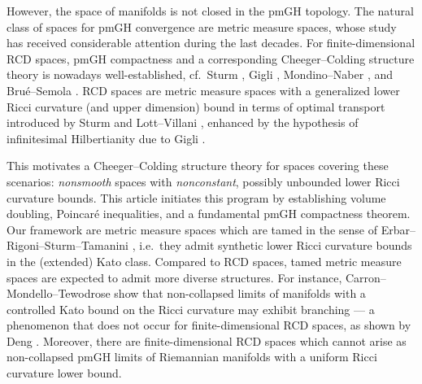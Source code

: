 \documentclass[10pt]{article}
\theoremstyle{plain}
\theoremstyle{definition}
\begin{document}
However, the space of manifolds is not closed in the pmGH topology. The natural class of spaces for pmGH convergence are metric measure spaces, whose study has received considerable attention during the last decades. For finite-dimensional RCD spaces, pmGH compactness and a corresponding Cheeger--Colding structure theory is nowadays well-established, cf.~Sturm \cite{sturm2006-ii}, Gigli \cite{gigli-splitting}, Mondino--Naber \cite{MondinoNaber}, and Brué--Semola \cite{BrueSemola}. RCD spaces are metric measure spaces with a generalized lower Ricci curvature (and upper dimension) bound in terms of optimal transport introduced by Sturm \cite{sturm2006-i,sturm2006-ii} and Lott--Villani \cite{lott-villani2009}, enhanced by the hypothesis of infinitesimal Hilbertianity due to Gigli \cite{Gigli15}. 

This motivates a Cheeger--Colding structure theory for spaces covering these scenarios: \emph{non\-smooth} spaces with \emph{nonconstant}, possibly unbounded lower Ricci curvature bounds. This article initiates this program by establishing volume doubling, Poincaré inequalities, and a fundamental pmGH compactness theorem. Our framework are metric measure spaces which are tamed in the sense of Erbar--Rigoni--Sturm--Tamanini \cite{ERST}, i.e.~they admit synthetic lower Ricci curvature bounds in the (extended) Kato class. Compared to RCD spaces, tamed metric measure spaces are expected to admit more diverse structures. For instance, Carron--Mondello--Tewodrose \cite{CMT_branching} show that non-collapsed limits of manifolds with a controlled Kato bound on the Ricci curvature may exhibit branching --- a phenomenon that does not occur for finite-dimensional RCD spaces, as shown by Deng \cite{deng}. Moreover, there are finite-dimensional RCD spaces which cannot arise as non-collapsed pmGH limits of Riemannian manifolds with a uniform Ricci curvature lower bound.
\end{document}
